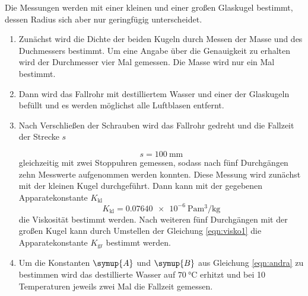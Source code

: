 Die Messungen werden mit einer kleinen und einer großen Glaskugel bestimmt,
dessen Radius sich aber nur geringfügig unterscheidet.
\begin{enumerate}
  \item Zunächst wird die Dichte der beiden Kugeln durch Messen der Masse
  und des Duchmessers bestimmt. Um eine Angabe über die Genauigkeit zu erhalten
  wird der Durchmesser vier Mal gemessen. Die Masse wird nur ein Mal bestimmt.

  \item Dann wird das Fallrohr mit destilliertem Wasser und einer der
  Glaskugeln befüllt und es werden möglichst
  alle Luftblasen entfernt.

  \item Nach Verschließen der Schrauben wird das Fallrohr gedreht und
  die Fallzeit der Strecke $s$

  \begin{equation*}
    s = \SI{100}{\milli\meter}
  \end{equation*}
  gleichzeitig mit zwei
  Stoppuhren gemessen, sodass nach fünf Durchgängen zehn Messwerte aufgenommen
  werden konnten. Diese Messung wird zunächst mit der kleinen Kugel durchgeführt.
  Dann kann mit der gegebenen Apparatekonstante $K_{\text{kl}}$
  \begin{equation*}
    K_{\text{kl}} = \SI{0.07640e-6}{\pascal\cubic\meter\per\kilo\gram}
  \end{equation*}
  die Viskosität bestimmt werden.
  Nach weiteren fünf Durchgängen mit der großen Kugel
  kann durch Umstellen der Gleichung \eqref{eqn:visko1} die
  Apparatekonstante $K_{\text{gr}}$ bestimmt werden.

  \item Um die Konstanten $\symup{A}$ und $\symup{B}$ aus Gleichung
  \eqref{eqn:andra} zu bestimmen wird das destillierte Wasser auf
  $\SI{70}{\celsius}$ erhitzt und bei 10 Temperaturen jeweils zwei Mal
  die Fallzeit gemessen.


\end{enumerate}
